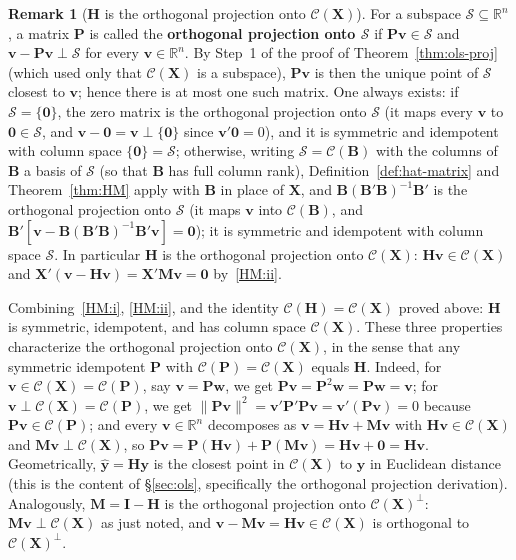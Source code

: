 \documentclass[12pt,a4paper]{article}
\theoremstyle{definition}
\newtheorem{remark}[theorem]{Remark}
\newcommand{\bX}{\mathbf{X}}
\newcommand{\by}{\mathbf{y}}
\newcommand{\bI}{\mathbf{I}}
\newcommand{\bH}{\mathbf{H}}
\newcommand{\bM}{\mathbf{M}}
\newcommand{\bzero}{\mathbf{0}}
\newcommand{\bw}{\mathbf{w}}
\newcommand{\bP}{\mathbf{P}}
\newcommand{\bv}{\mathbf{v}}
\newcommand{\Real}{\mathbb{R}}
\newcommand{\calC}{\mathcal{C}}
\begin{document}
\begin{remark}[$\bH$ is the orthogonal projection onto $\calC(\bX)$]\label{rem:hat-projection}
For a subspace $\mathcal{S} \subseteq \Real^n$, a matrix $\bP$ is called the \textbf{orthogonal projection onto $\mathcal{S}$} if $\bP\bv \in \mathcal{S}$ and $\bv - \bP\bv \perp \mathcal{S}$ for every $\bv \in \Real^n$. By Step~1 of the proof of Theorem~\ref{thm:ols-proj} (which used only that $\calC(\bX)$ is a subspace), $\bP\bv$ is then the unique point of $\mathcal{S}$ closest to $\bv$; hence there is at most one such matrix. One always exists: if $\mathcal{S} = \{\bzero\}$, the zero matrix is the orthogonal projection onto $\mathcal{S}$ (it maps every $\bv$ to $\bzero \in \mathcal{S}$, and $\bv - \bzero = \bv \perp \{\bzero\}$ since $\bv'\bzero = 0$), and it is symmetric and idempotent with column space $\{\bzero\} = \mathcal{S}$; otherwise, writing $\mathcal{S} = \calC(\mathbf{B})$ with the columns of $\mathbf{B}$ a basis of $\mathcal{S}$ (so that $\mathbf{B}$ has full column rank), Definition~\ref{def:hat-matrix} and Theorem~\ref{thm:HM} apply with $\mathbf{B}$ in place of $\bX$, and $\mathbf{B}(\mathbf{B}'\mathbf{B})^{-1}\mathbf{B}'$ is the orthogonal projection onto $\mathcal{S}$ (it maps $\bv$ into $\calC(\mathbf{B})$, and $\mathbf{B}'[\bv - \mathbf{B}(\mathbf{B}'\mathbf{B})^{-1}\mathbf{B}'\bv] = \bzero$); it is symmetric and idempotent with column space $\mathcal{S}$. In particular $\bH$ is the orthogonal projection onto $\calC(\bX)$: $\bH\bv \in \calC(\bX)$ and $\bX'(\bv - \bH\bv) = \bX'\bM\bv = \bzero$ by~\ref{HM:ii}.

Combining~\ref{HM:i}, \ref{HM:ii}, and the identity $\calC(\bH) = \calC(\bX)$ proved above: $\bH$ is symmetric, idempotent, and has column space $\calC(\bX)$. These three properties characterize the orthogonal projection onto $\calC(\bX)$, in the sense that any symmetric idempotent $\bP$ with $\calC(\bP) = \calC(\bX)$ equals $\bH$. Indeed, for $\bv \in \calC(\bX) = \calC(\bP)$, say $\bv = \bP\bw$, we get $\bP\bv = \bP^2\bw = \bP\bw = \bv$; for $\bv \perp \calC(\bX) = \calC(\bP)$, we get $\|\bP\bv\|^2 = \bv'\bP'\bP\bv = \bv'(\bP\bv) = 0$ because $\bP\bv \in \calC(\bP)$; and every $\bv \in \Real^n$ decomposes as $\bv = \bH\bv + \bM\bv$ with $\bH\bv \in \calC(\bX)$ and $\bM\bv \perp \calC(\bX)$, so $\bP\bv = \bP(\bH\bv) + \bP(\bM\bv) = \bH\bv + \bzero = \bH\bv$. Geometrically, $\hat{\by} = \bH\by$ is the closest point in $\calC(\bX)$ to $\by$ in Euclidean distance (this is the content of \S\ref{sec:ols}, specifically the orthogonal projection derivation). Analogously, $\bM = \bI - \bH$ is the orthogonal projection onto $\calC(\bX)^\perp$: $\bM\bv \perp \calC(\bX)$ as just noted, and $\bv - \bM\bv = \bH\bv \in \calC(\bX)$ is orthogonal to $\calC(\bX)^\perp$.
\end{remark}
\end{document}
